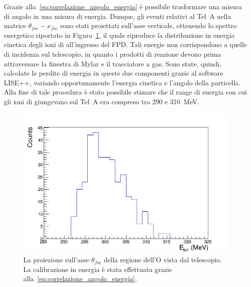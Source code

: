 Grazie alla~\ref{eq:correlazione_angolo_energia} è possibile trasformare una misura di angolo in una misura di energia.
Dunque, gli eventi relativi al Tel~A nella matrice $\theta_{foc} - x_{foc}$ sono stati proiettati sull'asse verticale, ottenendo lo spettro energetico riportato in Figura~\ref{fig:spettro_ekin}, il quale riproduce la distribuzione in energia cinetica degli ioni di  all'ingresso del FPD.
Tali energie non corrispondono a quelle di incidenza sul telescopio, in quanto i prodotti di reazione devono prima attraversare la finestra di Mylar e il tracciatore a gas.
Sono state, quindi, calcolate le perdite di energia in queste due componenti grazie al software LISE++, variando opportunamente l'energia cinetica e l'angolo della particella.
Alla fine di tale procedura è stato possibile stimare che il range di energia con cui gli ioni di  giungevano sul Tel~A era compreso tra 290 e 310~MeV.
\begin{figure} [!p]
	\centering
	\includegraphics[width=\textwidth, keepaspectratio]{Grafici_Tesi/Test/spettro_ekin.png}
	\caption{La proiezione sull'asse $\theta_{foc}$ della  regione dell'O vista dal telescopio. La calibrazione in energia è stata effettuata grazie alla~\ref{eq:correlazione_angolo_energia}.} \label{fig:spettro_ekin}
\end{figure}


\section{}

